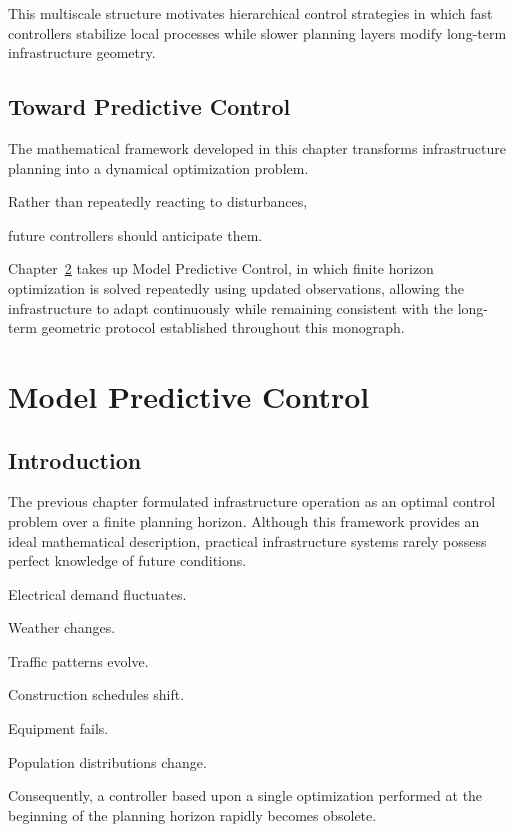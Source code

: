 \documentclass[11pt,fleqn]{book}
\numberwithin{equation}{chapter}
\theoremstyle{plain}
\theoremstyle{definition}
\theoremstyle{remark}
\begin{document}
This multiscale structure motivates hierarchical control strategies in
which fast controllers stabilize local processes while slower planning
layers modify long-term infrastructure geometry.


\section{Toward Predictive Control}

The mathematical framework developed in this chapter transforms
infrastructure planning into a dynamical optimization problem.

Rather than repeatedly reacting to disturbances,

future controllers should anticipate them.

Chapter~\ref{chap:model-predictive-control} takes up Model Predictive Control, in which finite
horizon optimization is solved repeatedly using updated observations,
allowing the infrastructure to adapt continuously while remaining
consistent with the long-term geometric protocol established throughout
this monograph.

\chapter{Model Predictive Control}
\label{chap:model-predictive-control}

\section{Introduction}

The previous chapter formulated infrastructure operation as an optimal
control problem over a finite planning horizon. Although this framework
provides an ideal mathematical description, practical infrastructure
systems rarely possess perfect knowledge of future conditions.

Electrical demand fluctuates.

Weather changes.

Traffic patterns evolve.

Construction schedules shift.

Equipment fails.

Population distributions change.

Consequently, a controller based upon a single optimization performed at
the beginning of the planning horizon rapidly becomes obsolete.
\end{document}

